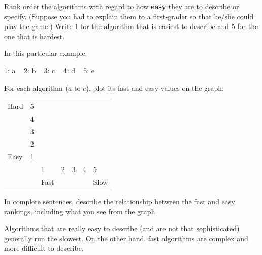 \Q Rank order the algorithms with regard to how \textbf{easy} they are to describe or specify.
(Suppose you had to explain them to a first-grader so that he/she could play the game.)
Write 1 for the algorithm that is easiest to describe and 5 for the one that is hardest.

\begin{answer}
In this particular example:

1: a ~ 2: b ~ 3: c ~ 4: d ~ 5: e
\end{answer}


\Q For each algorithm ($a$ to $e$), plot its fast and easy values on the graph:

\newcommand{\X}{\ans{X}}

\begin{table}[h]
\centering
\renewcommand{\arraystretch}{1.6}
\begin{tabularx}{275pt}{X C{28pt} | C{28pt} C{28pt} C{28pt} C{28pt} C{28pt}}
Hard & 5 & \X                    \\
     & 4 &    & \X               \\
     & 3 &    &   & \X           \\
     & 2 &    &   &   & \X       \\
Easy & 1 &    &   &   &   & \X   \\
\hline
     & & 1    & 2 & 3 & 4 & 5    \\
     & & Fast &   &   &   & Slow \\
\end{tabularx}
\end{table}


\Q In complete sentences, describe the relationship between the fast and easy rankings, including what you see from the graph.

\begin{answer}
Algorithms that are really easy to describe (and are not that sophisticated) generally run the slowest.
On the other hand, fast algorithms are complex and more difficult to describe.
\end{answer}
